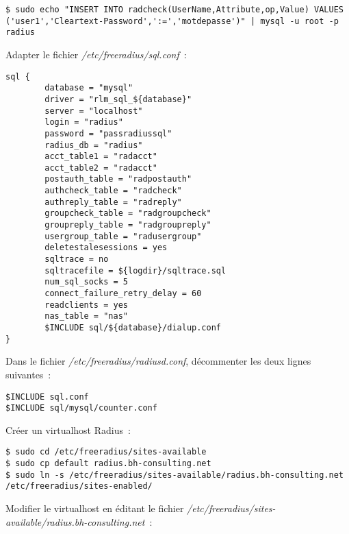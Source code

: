 \begin{lstlisting}
$ sudo echo "INSERT INTO radcheck(UserName,Attribute,op,Value) VALUES ('user1','Cleartext-Password',':=','motdepasse')" | mysql -u root -p radius
\end{lstlisting}

Adapter le fichier \emph{/etc/freeradius/sql.conf}~:
\begin{lstlisting}
sql {
        database = "mysql"
        driver = "rlm_sql_${database}"
        server = "localhost"
        login = "radius"
        password = "passradiussql"
        radius_db = "radius"
        acct_table1 = "radacct"
        acct_table2 = "radacct"
        postauth_table = "radpostauth"
        authcheck_table = "radcheck"
        authreply_table = "radreply"
        groupcheck_table = "radgroupcheck"
        groupreply_table = "radgroupreply"
        usergroup_table = "radusergroup"
        deletestalesessions = yes
        sqltrace = no
        sqltracefile = ${logdir}/sqltrace.sql
        num_sql_socks = 5
        connect_failure_retry_delay = 60
        readclients = yes
        nas_table = "nas"
        $INCLUDE sql/${database}/dialup.conf
}
\end{lstlisting}

Dans le fichier \emph{/etc/freeradius/radiusd.conf}, décommenter les deux lignes suivantes~:

\begin{lstlisting}
$INCLUDE sql.conf
$INCLUDE sql/mysql/counter.conf
\end{lstlisting}

Créer un virtualhost Radius~:
\begin{lstlisting}
$ sudo cd /etc/freeradius/sites-available
$ sudo cp default radius.bh-consulting.net
$ sudo ln -s /etc/freeradius/sites-available/radius.bh-consulting.net /etc/freeradius/sites-enabled/
\end{lstlisting}

Modifier le virtualhost en éditant le fichier \emph{/etc/freeradius/sites-available/radius.bh-consulting.net}~:

